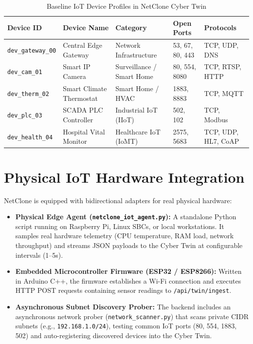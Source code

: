 \documentclass[12pt,a4paper]{report}
\begin{document}
\begin{table}[htbp]
\centering
\caption{Baseline IoT Device Profiles in NetClone Cyber Twin}
\label{tab:device_profiles}
\begin{tabular}{lllll}
\toprule
\textbf{Device ID} & \textbf{Device Name} & \textbf{Category} & \textbf{Open Ports} & \textbf{Protocols} \\
\midrule
\texttt{dev\_gateway\_00} & Central Edge Gateway & Network Infrastructure & 53, 67, 80, 443 & TCP, UDP, DNS \\
\texttt{dev\_cam\_01} & Smart IP Camera & Surveillance / Smart Home & 80, 554, 8080 & TCP, RTSP, HTTP \\
\texttt{dev\_therm\_02} & Smart Climate Thermostat & Smart Home / HVAC & 1883, 8883 & TCP, MQTT \\
\texttt{dev\_plc\_03} & SCADA PLC Controller & Industrial IoT (IIoT) & 502, 102 & TCP, Modbus \\
\texttt{dev\_health\_04} & Hospital Vital Monitor & Healthcare IoT (IoMT) & 2575, 5683 & TCP, UDP, HL7, CoAP \\
\bottomrule
\end{tabular}
\end{table}

\section{Physical IoT Hardware Integration}
NetClone is equipped with bidirectional adapters for real physical hardware:
\begin{itemize}
    \item \textbf{Physical Edge Agent (\texttt{netclone\_iot\_agent.py}):} A standalone Python script running on Raspberry Pi, Linux SBCs, or local workstations. It samples real hardware telemetry (CPU temperature, RAM load, network throughput) and streams JSON payloads to the Cyber Twin at configurable intervals (1--5s).
    \item \textbf{Embedded Microcontroller Firmware (ESP32 / ESP8266):} Written in Arduino C++, the firmware establishes a Wi-Fi connection and executes HTTP POST requests containing sensor readings to \texttt{/api/twin/ingest}.
    \item \textbf{Asynchronous Subnet Discovery Prober:} The backend includes an asynchronous network prober (\texttt{network\_scanner.py}) that scans private CIDR subnets (e.g., \texttt{192.168.1.0/24}), testing common IoT ports (80, 554, 1883, 502) and auto-registering discovered devices into the Cyber Twin.
\end{itemize}
\end{document}
